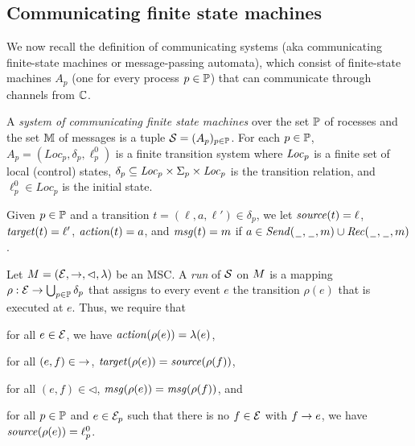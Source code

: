 \subsection{Communicating finite state machines\label{app:cfsm}}
We now recall the definition of communicating systems (aka communicating finite-state
machines or message-passing automata), which consist of finite-state machines $A_p$
(one for every process $p \in \mathbb{P}$) that can communicate through channels from $\mathbb{C}$.

\begin{definition}\label{def:cs}
A \emph{system of communicating finite state machines} over the set $\mathbb{P}$ of rocesses
and the set $\mathbb{M}$ of messages is a tuple
   $ \mathcal{S} = (A_p)_{p\in\mathbb{P}}$. For each
   $p \in \mathbb{P}$, $A_p = (Loc_p, \delta_p, \ell^0_p)$ is a finite transition system where
   $\mathit{Loc}_p$ is a finite set of local (control) states, $\delta_p
   \subseteq \mathit{Loc}_p \times \Sigma_{p} \times \mathit{Loc}_p$ is the
   transition relation, and $\ell^0_p \in Loc_p$ is the initial state.
\end{definition}

Given $p \in \mathbb{P}$ and a transition $t = (\ell,a,\ell') \in \delta_p$, we let
$\mathit{source}(t) = \ell$, $\mathit{target}(t) = \ell'$, $\mathit{action}(t) = a$, and
$\mathit{msg}(t) = m$ if $a \in {\mathit{Send}(\hspace{0.1em}\underline{\hspace{0.5em}}\hspace{0.1em},\hspace{0.1em}\underline{\hspace{0.5em}}\hspace{0.1em},m)} \cup {\mathit{Rec}(\hspace{0.1em}\underline{\hspace{0.5em}}\hspace{0.1em},\hspace{0.1em}\underline{\hspace{0.5em}}\hspace{0.1em},m)}$.




Let $M = (\mathcal{E},\to,\lhd,\lambda)$ be an MSC.
A \emph{run} of $\mathcal{S}$ on $M$ is a mapping
$\rho: \mathcal{E} \to \bigcup_{p \in \mathbb{P}} \delta_p$
that assigns to every event $e$ the transition $\rho(e)$
that is executed at $e$. Thus, we require that
\begin{enumerate*}[label={(\roman*)}]
\item for all $e \in \mathcal{E}$, we have $\mathit{action}(\rho(e)) = \lambda(e)$,
\item for all $(e,f) \in {\to}$, $\mathit{target}(\rho(e)) = \mathit{source}(\rho(f))$,
\item for all $(e,f) \in {\lhd}$, $\mathit{msg}(\rho(e)) = \mathit{msg}(\rho(f))$,
and
\item for all $p \in \mathbb{P}$ and $e \in \mathcal{E}_p$ such that there is no $f \in \mathcal{E}$ with $f \to e$, we have $\mathit{source}(\rho(e)) = \ell_p^0$.
\end{enumerate*}

